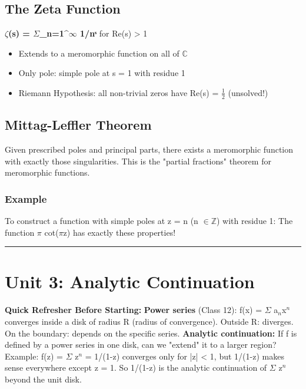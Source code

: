\documentclass[12pt,a4paper,openany]{book}
\begin{document}
{{\subsection{The Zeta Function}

\textbf{$\zeta$(s) = $\Sigma$_{n=1}^$\infty$ 1/nˢ} for Re(s) > 1

\begin{itemize}[leftmargin=*]
  \item Extends to a meromorphic function on all of $\mathbb{C}$
  \item Only pole: simple pole at s = 1 with residue 1
  \item Riemann Hypothesis: all non-trivial zeros have Re(s) = $\frac{1}{2}$ (unsolved!)
\end{itemize}

\subsection{Mittag-Leffler Theorem}

Given prescribed poles and principal parts, there exists a meromorphic function with exactly those singularities. This is the "partial fractions" theorem for meromorphic functions.

\subsubsection{Example}
To construct a function with simple poles at z = n (n $\in\mathbb{Z}$) with residue 1:
The function $\pi$ cot($\pi$z) has exactly these properties!

\bigskip\noindent\rule{\textwidth}{0.4pt}\bigskip

\section{Unit 3: Analytic Continuation}

\begin{prereqbox}
 \textbf{Quick Refresher Before Starting:}
\textbf{Power series} (Class 12): f(x) = $\Sigma$ a$_n$x$^n$ converges inside a disk of radius R (radius of convergence).
Outside R: diverges. On the boundary: depends on the specific series.
\textbf{Analytic continuation:} If f is defined by a power series in one disk, can we "extend" it to a larger region?
Example: f(z) = $\Sigma$ z$^n$ = 1/(1-z) converges only for |z| < 1, but 1/(1-z) makes sense everywhere except z = 1.
So 1/(1-z) is the analytic continuation of $\Sigma$ z$^n$ beyond the unit disk.
\end{prereqbox}


}}
\end{document}
